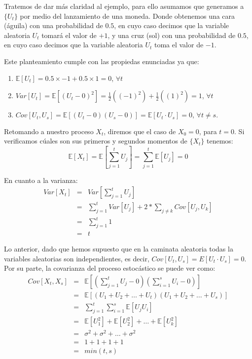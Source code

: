 \documentclass[
]{book}
\begin{document}
Tratemos de dar más claridad al ejemplo, para ello asumamos que generamos a \(\{U_t\}\) por medio del lanzamiento de una moneda. Donde obtenemos una cara (águila) con una probabilidad de \(0.5\), en cuyo caso decimos que la variable aleatoria \(U_t\) tomará el valor de \(+1\), y una cruz (sol) con una probabilidad de \(0.5\), en cuyo caso decimos que la variable aleatoria \(U_t\) toma el valor de \(-1\).

Este planteamiento cumple con las propiedas enunciadas ya que:

\begin{enumerate}
\def\labelenumi{\arabic{enumi}.}
\item
  \(\mathbb{E}[U_t] = 0.5 \times -1 + 0.5 \times 1 = 0\), \(\forall t\)
\item
  \(Var[U_t] = \mathbb{E}[(U_t - 0)^2] = \frac{1}{2}((-1)^2) + \frac{1}{2}((1)^2) = 1\), \(\forall t\)
\item
  \(Cov[U_t,U_s] = \mathbb{E}[(U_t - 0)(U_s - 0)] = \mathbb{E}[U_t \cdot U_s] = 0\), \(\forall t \neq s\).
\end{enumerate}

Retomando a nuestro proceso \(X_t\), diremos que el caso de \(X_0 = 0\), para \(t = 0\). Si verificamos cúales son sus primeros y segundos momentos de \(\{X_t\}\) tenemos:
\begin{equation}
    \mathbb{E}[X_t] = \mathbb{E}\left[ \sum^t_{j=1} U_j \right] = \sum^t_{j=1} \mathbb{E}[U_j] = 0
    \label{eq:em3}
\end{equation}

En cuanto a la varianza:
\begin{eqnarray}
    Var[X_t] & = & Var \left[ \sum^t_{j=1} U_j \right] \nonumber \\
    & = & \sum^t_{j=1} Var[U_j] + 2 * \sum_{j \neq k} Cov[U_j,U_k] \nonumber \\
    & = & \sum^t_{j=1} 1 \nonumber \\
    & = & t
    \label{eq:em4}
\end{eqnarray}

Lo anterior, dado que hemos supuesto que en la caminata aleatoria todas la variables aleatorias son independientes, es decir, \(Cov[U_t,U_s] = E[U_t \cdot U_s] = 0\). Por su parte, la covarianza del proceso estocástico se puede ver como:
\begin{eqnarray*}
    Cov[X_t,X_s] & = & \mathbb{E} \left[ \left( \sum^t_{j=1} U_j - 0 \right) \left( \sum^s_{i=1} U_i - 0 \right) \right] \\
    & = & \mathbb{E}[(U_1 + U_2 + \ldots + U_t)(U_1 + U_2 + \ldots + U_s)] \\
    & = & \sum^t_{j=1} \sum^s_{i=1} \mathbb{E}[U_j U_i] \\
    & = & \mathbb{E}[U^2_1] + \mathbb{E}[U^2_2] + \ldots + \mathbb{E}[U^2_k] \\
    & = & \sigma^2 + \sigma^2 + \ldots + \sigma^2 \\
    & = & 1 + 1 + 1 + 1 \\
    & = & min(t,s)
\end{eqnarray*}
\end{document}
